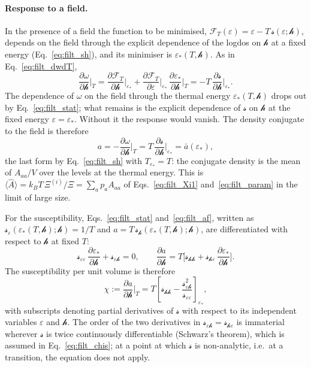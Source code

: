 \documentclass[10pt,a4paper]{article}
\theoremstyle{plain}
\newcommand{\lndos}{{logdos}}  %
\newcommand{\hfield}{\mathscr{h}}  %
\newcommand{\Fen}[1][T]{\mathscr{F}_{#1}}  %
\newcommand{\lds}{\mathscr{s}}  %
\begin{document}
\paragraph{Response to a field.} In the presence of a field the function to
be minimised, $\Fen(\varepsilon)=\varepsilon-T\,\lds(\varepsilon;\hfield)$,
depends on the
field through the explicit dependence of the \lndos{} on $\hfield$ at a
fixed energy (Eq.~\eqref{eq:filt_sh}), and its minimiser is
$\varepsilon_*(T,\hfield)$. As in Eq.~\eqref{eq:filt_dwdT},
\begin{equation}\label{eq:filt_dwdh}
  \frac{\partial\omega}{\partial\hfield}\bigg|_{T}
  =\frac{\partial\Fen}{\partial\hfield}\bigg|_{\varepsilon_*}
  +\frac{\partial\Fen}{\partial\varepsilon}\bigg|_{\varepsilon_*}\,
  \frac{\partial\varepsilon_*}{\partial\hfield}\bigg|_{T}
  =-T\,\frac{\partial\lds}{\partial\hfield}\bigg|_{\varepsilon_*} .
\end{equation}
The dependence of $\omega$ on the field through the thermal energy
$\varepsilon_*(T,\hfield)$ drops out by Eq.~\eqref{eq:filt_stat}; what remains
is the explicit dependence of $\lds$ on $\hfield$ at the fixed energy
$\varepsilon=\varepsilon_*$. Without it the response would vanish. The
density conjugate to the field is therefore
\begin{equation}\label{eq:filt_af}
  a=-\frac{\partial\omega}{\partial \hfield}\bigg|_{T}
  =T\,\frac{\partial \lds}{\partial \hfield}\bigg|_{\varepsilon_*}
  =\bar a(\varepsilon_*) ,
\end{equation}
the last form by Eq.~\eqref{eq:filt_sh} with $T_{\varepsilon_*}=T$: the
conjugate density is the mean of $A_{aa}/V$ over the levels at the thermal
energy. This is $\langle\hat A\rangle=k_BT\,\Xi^{(i)}/\Xi=\sum_ap_aA_{aa}$ of
Eqs.~\eqref{eq:filt_Xi1} and~\eqref{eq:filt_param} in the limit of large
size.

For the susceptibility, Eqs.~\eqref{eq:filt_stat} and~\eqref{eq:filt_af},
written as $\lds_\varepsilon(\varepsilon_*(T,\hfield);\hfield)=1/T$ and
$a=T\,\lds_\hfield(\varepsilon_*(T,\hfield);\hfield)$, are differentiated with
respect to $\hfield$ at fixed $T$:
\[
  \lds_{\varepsilon\varepsilon}\,\frac{\partial\varepsilon_*}{\partial\hfield}
  +\lds_{\varepsilon\hfield}=0 ,
  \qquad
  \frac{\partial a}{\partial\hfield}
  =T\Big[\lds_{\hfield\hfield}
  +\lds_{\hfield\varepsilon}\,\frac{\partial\varepsilon_*}{\partial\hfield}\Big] .
\]
The susceptibility per unit volume is therefore
\begin{equation}\label{eq:filt_chis}
  \chi:=\frac{\partial a}{\partial\hfield}\bigg|_{T}
  =T\left[\lds_{\hfield\hfield}
  -\frac{\lds_{\varepsilon\hfield}^{2}}{\lds_{\varepsilon\varepsilon}}\right]_{\varepsilon_*} ,
\end{equation}
with subscripts denoting partial derivatives of $\lds$ with respect to its
independent variables $\varepsilon$ and $\hfield$. The order of the two
derivatives in $\lds_{\varepsilon\hfield}=\lds_{\hfield\varepsilon}$ is
immaterial wherever $\lds$ is twice continuously differentiable (Schwarz's
theorem), which is assumed in Eq.~\eqref{eq:filt_chis}; at a point at which
$\lds$ is non-analytic, i.e.\ at a transition, the equation does not apply.
\end{document}
